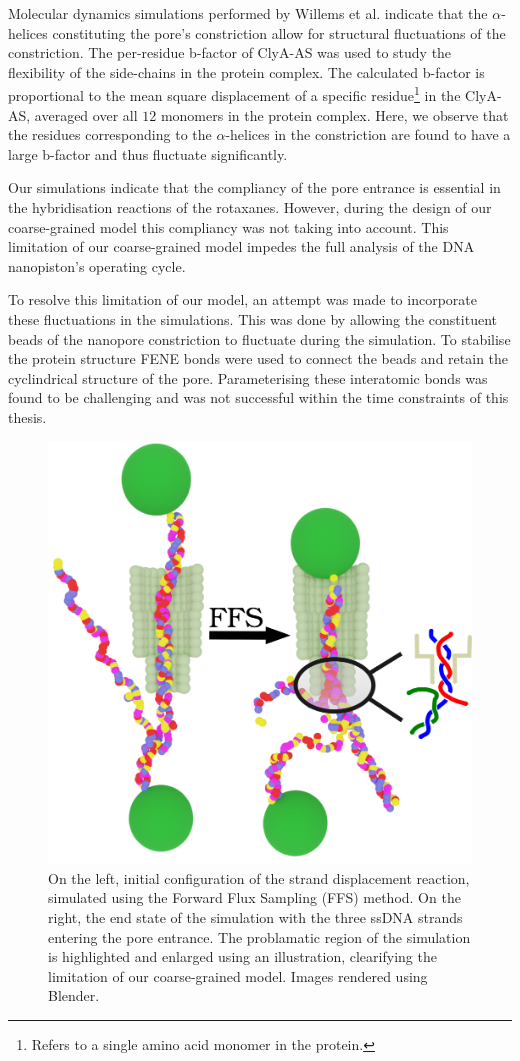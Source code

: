 Molecular dynamics simulations performed by Willems et al.\cite{Willems2020} indicate
that the $\alpha$-helices constituting the pore's constriction allow for structural
fluctuations of the constriction. The per-residue b-factor of ClyA-AS was used to study
the flexibility of the side-chains in the protein complex. The calculated b-factor is
proportional to the mean square displacement of a specific residue\footnote{Refers to a
single amino acid
monomer in the protein.} in the ClyA-AS, averaged over all
$12$ monomers in the protein complex. Here, we observe that the residues corresponding to
the $\alpha$-helices in the constriction are found to have a large b-factor and thus
fluctuate significantly.

Our simulations indicate that the compliancy of the pore
entrance is essential in the hybridisation reactions of the rotaxanes. However, during
the design of our coarse-grained model this compliancy was not taking into account. This
limitation of our coarse-grained model impedes the full analysis of the DNA nanopiston's
operating cycle.

To resolve this limitation of our model, an attempt was made to incorporate these
fluctuations in the simulations. This was done by allowing the constituent beads of the
nanopore constriction to fluctuate during the simulation. To stabilise the protein
structure FENE bonds were used to connect the beads and retain the cyclindrical structure
of the pore. Parameterising these interatomic bonds was found to be challenging and was
not successful within the time constraints of this thesis.\\

\begin{figure}[ht!]
  \centering
  \includegraphics[width=0.7\linewidth]{Figures/hybridisation.png}
  \caption[Simulation result of strand displacement reaction.]{{\small On the left,
        initial configuration of the strand displacement reaction, simulated using the
        Forward Flux Sampling (FFS) method.  On the right, the end state of the
        simulation with the three ssDNA strands entering the pore entrance.
        The problamatic region of the simulation is highlighted and enlarged using an
        illustration, clearifying the limitation of our coarse-grained model. Images
  rendered using Blender.\cite{blender}}}
\end{figure}

